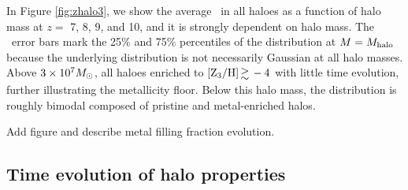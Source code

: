 \documentclass[useAMS,usenatbib]{mn2e}
\begin{document}
In Figure \ref{fig:zhalo3}, we show the average \zthree~in all haloes
as a function of halo mass at $z =$ 7, 8, 9, and 10, and it is
strongly dependent on halo mass.  The \zthree~error bars mark the 25\%
and 75\% percentiles of the distribution at $M = M_{\rm halo}$ because
the underlying distribution is not necessarily Gaussian at all halo
masses.  Above $3 \times 10^7 \Ms$, all haloes enriched to $\zthree
\ga -4$ with little time evolution, further illustrating the
metallicity floor.  Below this halo mass, the distribution is roughly
bimodal composed of pristine and metal-enriched halos.

\li Add figure and describe metal filling fraction evolution.

\subsection{Time evolution of halo properties}

\begin{figure*}
  \caption{\label{fig:z7-mosaic} Density-weighted projections of
    density (left), temperature (center), and metallicity (right) of
    the 10 most massive haloes at $z=7$.  The field of view is 5 proper
    kpc, and the circles have a radius of $r_{200}$.  The composite
    metallicity images are constructed in the same fashion as
    Fig. \ref{fig:evo-mosaic}.}
\end{figure*}

\begin{figure*}
  \caption{\label{fig:z8-mosaic} Same as Fig. \ref{fig:z7-mosaic} but
    at $z=8$, showing the progenitors of the 10 most massive haloes at
    $z=7$.}
\end{figure*}

\begin{figure*}
  \caption{\label{fig:z10-mosaic} Same as Fig. \ref{fig:z8-mosaic} at
    $z=10$.}
\end{figure*}
\end{document}

